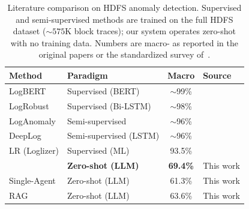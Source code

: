\begin{table}[H]
\centering
\caption{Literature comparison on HDFS anomaly detection. Supervised and semi-supervised
methods are trained on the full HDFS dataset (${\sim}575$K block traces); our system
operates zero-shot with no training data. Numbers are macro-\fone{} as reported in the
original papers or the standardized survey of~\cite{le2022logdlhowfar}.}
\label{tab:hdfs-dl-comparison}
\begin{tabular}{llcl}
\toprule
\textbf{Method} & \textbf{Paradigm} & \textbf{Macro \fone{}} & \textbf{Source} \\
\midrule
LogBERT          & Supervised (BERT)   & ${\sim}$99\%  & \cite{guo2021logbert} \\
LogRobust        & Supervised (Bi-LSTM)& ${\sim}$98\%  & \cite{zhang2019logrobust} \\
LogAnomaly       & Semi-supervised     & ${\sim}$96\%  & \cite{ijcai2019p658} \\
DeepLog          & Semi-supervised (LSTM)& ${\sim}$96\% & \cite{du2017deeplog} \\
LR (Loglizer)    & Supervised (ML)     & 93.5\%        & \cite{he2016loglizer} \\
\midrule
\textbf{\systemname{}} & \textbf{Zero-shot (LLM)} & \textbf{69.4\%} & This work \\
Single-Agent     & Zero-shot (LLM)     & 61.3\%        & This work \\
RAG              & Zero-shot (LLM)     & 63.6\%        & This work \\
\bottomrule
\end{tabular}
\end{table}

